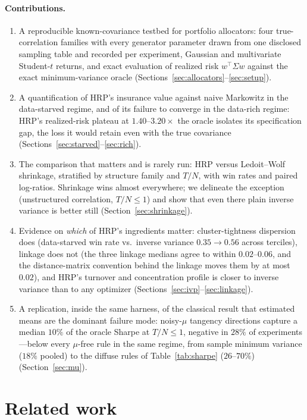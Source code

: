 \documentclass[11pt]{article}
\newcommand{\Sig}{\Sigma}
\newcommand{\TN}{T/N}
\begin{document}
\paragraph{Contributions.}
\begin{enumerate}\itemsep2pt
\item A reproducible known-covariance testbed for portfolio allocators: four
true-correlation families with every generator parameter drawn from one
disclosed sampling table and recorded per experiment, Gaussian and
multivariate Student-$t$ returns, and exact evaluation of realized risk
$w^{\top}\Sig w$ against the exact minimum-variance oracle
(Sections~\ref{sec:allocators}--\ref{sec:setup}).
\item A quantification of HRP's insurance value against naive Markowitz in
the data-starved regime, and of its failure to converge in the data-rich
regime: HRP's realized-risk plateau at $1.40$--$3.20\times$ the oracle
isolates its specification gap, the loss it would retain even with the true
covariance (Sections~\ref{sec:starved}--\ref{sec:rich}).
\item The comparison that matters and is rarely run: HRP versus Ledoit--Wolf
shrinkage, stratified by structure family and $\TN$, with win rates and
paired log-ratios. Shrinkage wins almost everywhere; we delineate the
exception (unstructured correlation, $\TN\le1$) and show that even there
plain inverse variance is better still (Section~\ref{sec:shrinkage}).
\item Evidence on \emph{which} of HRP's ingredients matter: cluster-tightness
dispersion does (data-starved win rate vs.\ inverse variance $0.35\to0.56$
across terciles), linkage does not (the three linkage medians agree to
within $0.02$--$0.06$, and the distance-matrix convention behind the linkage
moves them by at most $0.02$), and HRP's turnover and concentration profile
is closer to inverse variance than to any optimizer
(Sections~\ref{sec:ivp}--\ref{sec:linkage}).
\item A replication, inside the same harness, of the classical result that
estimated means are the dominant failure mode: noisy-$\mu$ tangency
directions capture a median $10\%$ of the oracle Sharpe at $\TN\le1$,
negative in $28\%$ of experiments---below every $\mu$-free rule in the same
regime, from sample minimum variance ($18\%$ pooled) to the diffuse rules of
Table~\ref{tab:sharpe} ($26$--$70\%$) (Section~\ref{sec:mu}).
\end{enumerate}

\section{Related work}
\label{sec:related}
\end{document}
